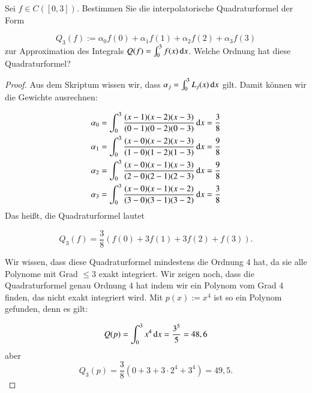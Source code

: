 
\begin{exercise}
  Sei $f \in C([0,3])$. Bestimmen Sie die interpolatorische Quadraturformel der Form

  \begin{equation*}
     Q_3(f):=\alpha_0f(0)+\alpha_1f(1)+\alpha_2f(2)+\alpha_3f(3)
  \end{equation*}
  zur Approximation des Integrals $Q(f)=\int_0^3{f(x) \dif x}$. Welche Ordnung hat diese Quadraturformel?
\end{exercise}
\begin{proof}
  Aus dem Skriptum wissen wir, dass $\alpha_j=\int_0^3{L_j(x) \dif x}$ gilt. Damit können wir die Gewichte ausrechnen:

  \begin{equation*}
    \begin{split}
      \alpha_0&=\int_0^3{\frac{(x-1)(x-2)(x-3)}{(0-1)(0-2)(0-3)} \dif x} = \frac{3}{8} \\
      \alpha_1&=\int_0^3{\frac{(x-0)(x-2)(x-3)}{(1-0)(1-2)(1-3)} \dif x} = \frac{9}{8} \\
      \alpha_2&=\int_0^3{\frac{(x-0)(x-1)(x-3)}{(2-0)(2-1)(2-3)} \dif x} = \frac{9}{8} \\
      \alpha_3&=\int_0^3{\frac{(x-0)(x-1)(x-2)}{(3-0)(3-1)(3-2)} \dif x} = \frac{3}{8} \\
    \end{split}
  \end{equation*}
  Das heißt, die Quadraturformel lautet

  \begin{equation*}
    Q_3(f)=\frac{3}{8}(f(0)+3f(1)+3f(2)+f(3)).
  \end{equation*}

  Wir wissen, dass diese Quadraturformel mindestens die Ordnung $4$ hat, da sie alle Polynome mit Grad $\leq 3$ exakt integriert. Wir zeigen noch, dass die Quadraturformel genau Ordnung $4$ hat indem wir ein Polynom vom Grad $4$ finden, das nicht exakt integriert wird. Mit $p(x):=x^4$ ist so ein Polynom gefunden, denn es gilt:

  \begin{equation*}
    Q(p)=\int_0^3{x^4 \dif x} = \frac{3^5}{5}=48,6
  \end{equation*}
  aber
  \begin{equation*}
    Q_3(p)=\frac{3}{8}(0 + 3 + 3\cdot 2^4 + 3^4)=49,5.
  \end{equation*}
\end{proof}
